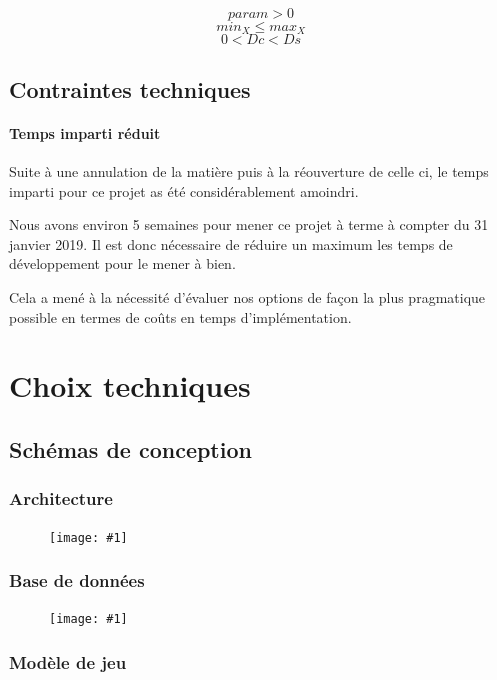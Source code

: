\documentclass[
	headsepline=on,
	footsepline=on,
	twoside=off,
	abstract=on,
	DIV=10
]{scrreprt}
\newcommand{\img}[1]{
\begin{figure}[H]
	\centering
	\texttt{[image: \#1]}
\end{figure}
}
\begin{document}
				\begin{equation}
					param > 0
				\end{equation}
				\begin{equation}
					min_X \le max_X
				\end{equation}
				\begin{equation}
					0 < Dc < Ds
				\end{equation}
				
				
			\subsection{Contraintes techniques}
				\paragraph{Temps imparti réduit}
				
				Suite à une annulation de la matière puis à la réouverture de celle ci, le temps imparti pour ce projet as été considérablement amoindri.
				
				Nous avons environ 5 semaines pour mener ce projet à terme à compter du 31 janvier 2019.
				Il est donc nécessaire de réduire un maximum les temps de développement pour le mener à bien.
				
				Cela a mené à la nécessité d'évaluer nos options de façon la plus pragmatique possible en termes de coûts en temps d'implémentation.
				
				
				
		
		\section{Choix techniques}
			\subsection{Schémas de conception}
			\subsubsection{Architecture}
			\img{./pics/archi}
			\subsubsection{Base de données}
			\img{./pics/bdd_archi}
			\subsubsection{Modèle de jeu}
			
\end{document}
